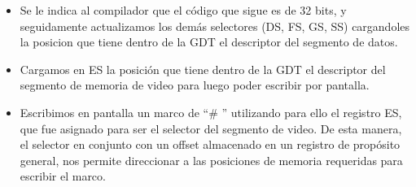 \begin{itemize}
 \item Se le indica al compilador que el c\'odigo que sigue es de 32 bits, y seguidamente actualizamos los dem\'as selectores (DS, FS, GS, SS) cargandoles la posicion que tiene dentro de la GDT el descriptor del segmento de datos.

 \item Cargamos en ES la posici\'on que tiene dentro de la GDT el descriptor del segmento de memoria de video para luego poder escribir por pantalla.
 
 \item Escribimos en pantalla un marco de ``\# '' utilizando para ello el registro ES, que fue asignado para ser el selector del segmento de video. De esta manera, el selector en conjunto con un offset almacenado en un registro de prop\'osito general, nos permite direccionar a las posiciones de memoria requeridas para escribir el marco.
\end{itemize}

\vspace{22pt}

